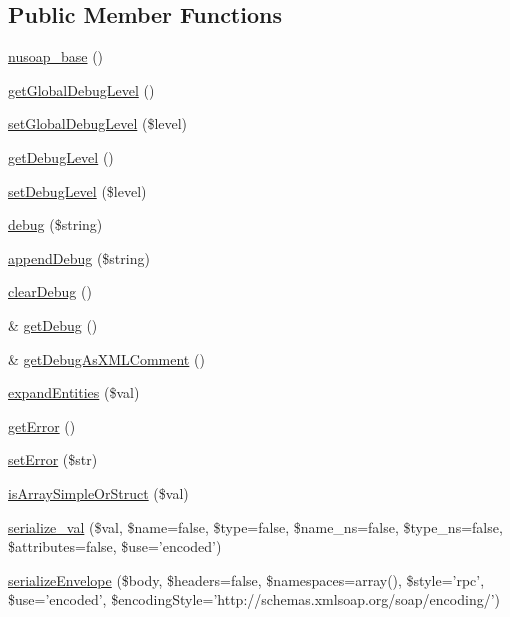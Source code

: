 \subsection*{Public Member Functions}
\begin{DoxyCompactItemize}
\item 
\hyperlink{classnusoap__base_a07443354955c9c613494da2c352f8c6e}{nusoap\-\_\-base} ()
\item 
\hyperlink{classnusoap__base_ace64a2a947aa8b2e41b59676eb3b2c04}{get\-Global\-Debug\-Level} ()
\item 
\hyperlink{classnusoap__base_a11ccf93dc5a46058da219a8dc2a826f1}{set\-Global\-Debug\-Level} (\$level)
\item 
\hyperlink{classnusoap__base_a122db96cedfc221cf187ce4328f992f7}{get\-Debug\-Level} ()
\item 
\hyperlink{classnusoap__base_a5254eafb0d4b255e290f98b186a7036d}{set\-Debug\-Level} (\$level)
\item 
\hyperlink{classnusoap__base_ac652bd9010bd39b0f2854f7ded3f6f33}{debug} (\$string)
\item 
\hyperlink{classnusoap__base_a659455287a25d64cd0bcb0c04ec9d62d}{append\-Debug} (\$string)
\item 
\hyperlink{classnusoap__base_a5b44893b1d018eee5868a29ef790b97a}{clear\-Debug} ()
\item 
\& \hyperlink{classnusoap__base_a4b229e854137bd6ffae366eac8374623}{get\-Debug} ()
\item 
\& \hyperlink{classnusoap__base_a756e9d545f662fdd678613ffdbb8b979}{get\-Debug\-As\-X\-M\-L\-Comment} ()
\item 
\hyperlink{classnusoap__base_ad9e06c7fc6850aa47459bab8f5593520}{expand\-Entities} (\$val)
\item 
\hyperlink{classnusoap__base_a24ada5decce3d1b79cd82f5a90ccf404}{get\-Error} ()
\item 
\hyperlink{classnusoap__base_a89a9fdd49ee8436ae44af84f18177bcf}{set\-Error} (\$str)
\item 
\hyperlink{classnusoap__base_a3f7c5ca19c4afead9923f60efc66b9de}{is\-Array\-Simple\-Or\-Struct} (\$val)
\item 
\hyperlink{classnusoap__base_a22f911ea3c09627dd423ded892862033}{serialize\-\_\-val} (\$val, \$name=false, \$type=false, \$name\-\_\-ns=false, \$type\-\_\-ns=false, \$attributes=false, \$use='encoded')
\item 
\hyperlink{classnusoap__base_a8b06d8e53a3ca64b0d28d76dbdbd1cb3}{serialize\-Envelope} (\$body, \$headers=false, \$namespaces=array(), \$style='rpc', \$use='encoded', \$encoding\-Style='http\-://schemas.\-xmlsoap.\-org/soap/encoding/')

\end{DoxyCompactItemize}
